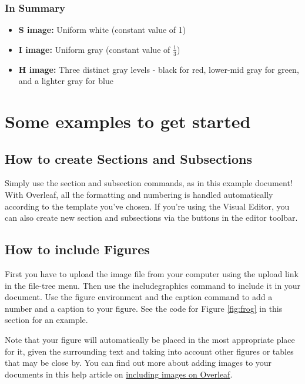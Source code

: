 \documentclass{article}
\begin{document}
\subsubsection*{In Summary}
\begin{itemize}
    \item \textbf{S image:} Uniform white (constant value of 1)
    \item \textbf{I image:} Uniform gray (constant value of \( \frac{1}{3} \))
    \item \textbf{H image:} Three distinct gray levels - black for red, lower-mid gray for green, and a lighter gray for blue
\end{itemize}

\section{Some examples to get started}

\subsection{How to create Sections and Subsections}

Simply use the section and subsection commands, as in this example document! With Overleaf, all the formatting and numbering is handled automatically according to the template you've chosen. If you're using the Visual Editor, you can also create new section and subsections via the buttons in the editor toolbar.

\subsection{How to include Figures}

First you have to upload the image file from your computer using the upload link in the file-tree menu. Then use the includegraphics command to include it in your document. Use the figure environment and the caption command to add a number and a caption to your figure. See the code for Figure \ref{fig:frog} in this section for an example.

Note that your figure will automatically be placed in the most appropriate place for it, given the surrounding text and taking into account other figures or tables that may be close by. You can find out more about adding images to your documents in this help article on \href{https://www.overleaf.com/learn/how-to/Including_images_on_Overleaf}{including images on Overleaf}.
\end{document}
